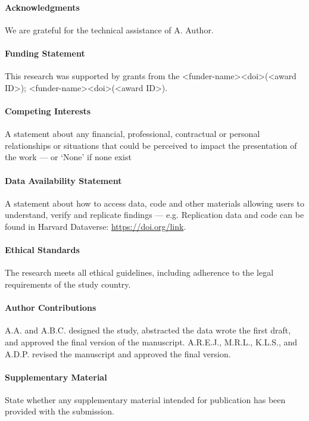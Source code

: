 \documentclass{CUP-JNL-DAP}%
\begin{document}
\begin{Backmatter}

\paragraph{Acknowledgments}
We are grateful for the technical assistance of A. Author.

\paragraph{Funding Statement}
This research was supported by grants from the <funder-name><doi>(<award ID>); <funder-name><doi>(<award ID>).

\paragraph{Competing Interests}
A statement about any financial, professional, contractual or personal relationships or situations that could be perceived to impact the presentation of the work --- or `None' if none exist

\paragraph{Data Availability Statement}
A statement about how to access data, code and other materials allowing users to understand, verify and replicate findings --- e.g. Replication data and code can be found in Harvard Dataverse: \url{https://doi.org/link}.

\paragraph{Ethical Standards}
The research meets all ethical guidelines, including adherence to the legal requirements of the study country.

\paragraph{Author Contributions}
A.A. and A.B.C. designed the study, abstracted the data wrote the first draft, and approved the final
version of the manuscript. A.R.E.J., M.R.L., K.L.S., and A.D.P. revised the manuscript and approved the final version.

\paragraph{Supplementary Material}
State whether any supplementary material intended for publication has been provided with the submission.


\end{Backmatter}
\end{document}
